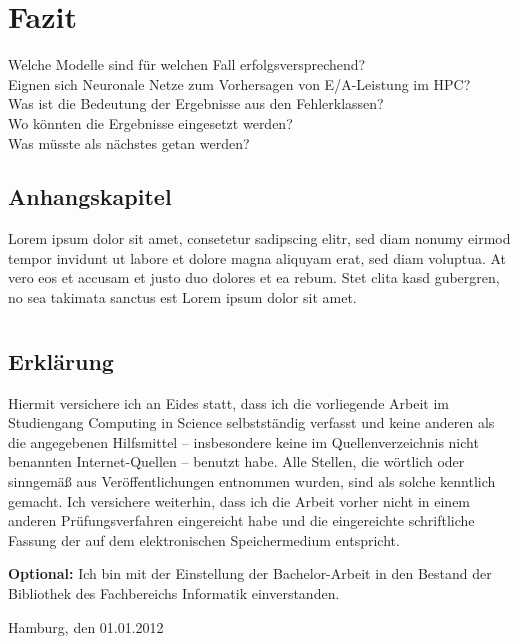 \documentclass[
	12pt,
	a4paper,
	BCOR10mm,
	DIV14,
	listof=totoc,
	bibliography=totoc,
	headsepline
]{scrreprt}
\begin{document}
\chapter{Fazit}
\label{Fazit}
Welche Modelle sind für welchen Fall erfolgsversprechend?\\
Eignen sich Neuronale Netze zum Vorhersagen von E/A-Leistung im HPC?\\
Was ist die Bedeutung der Ergebnisse aus den Fehlerklassen?\\
Wo könnten die Ergebnisse eingesetzt werden?\\
Was müsste als nächstes getan werden?\\




\listoffigures

\listoftables

\lstlistoflistings

\begin{appendices}

\chapter{Anhangskapitel}

Lorem ipsum dolor sit amet, consetetur sadipscing elitr, sed diam nonumy eirmod tempor invidunt ut labore et dolore magna aliquyam erat, sed diam voluptua.
At vero eos et accusam et justo duo dolores et ea rebum.
Stet clita kasd gubergren, no sea takimata sanctus est Lorem ipsum dolor sit amet.

\end{appendices}

\newpage

\thispagestyle{empty}

\chapter*{}

\section*{Erklärung}

Hiermit  versichere  ich  an  Eides  statt,  dass  ich  die   vorliegende  Arbeit  im 
Studiengang  Computing  in  Science  selbstständig  verfasst  und  keine  anderen  als 
die  angegebenen  Hilfsmittel – insbesondere  keine  im  Quellenverzeichnis  nicht 
benannten  Internet-Quellen – benutzt  habe.  Alle  Stellen,  die  wörtlich  oder 
sinngemäß aus Veröffentlichungen entnommen wurden, sind als solche kenntlich 
gemacht.  Ich  versichere  weiterhin,  dass  ich  die  Arbeit  vorher  nicht  in  einem 
anderen  Prüfungsverfahren  eingereicht  habe  und  die  eingereichte  schriftliche 
Fassung der auf dem elektronischen 
Speichermedium entspricht.

\smallskip

\textbf{Optional:} Ich bin mit der Einstellung der Bachelor-Arbeit in den Bestand der Bibliothek des Fachbereichs Informatik einverstanden.

\bigskip
\bigskip
\bigskip

Hamburg, den 01.01.2012  \quad \dotfill
\end{document}
